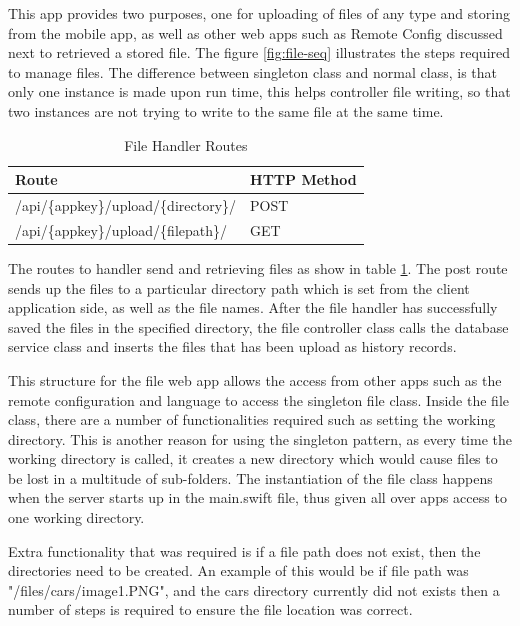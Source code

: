 This app provides two purposes, one for uploading of files of any type and storing from the mobile app, as well as other web apps such as Remote Config discussed next to retrieved a stored file. The figure \ref{fig:file-seq} illustrates the steps required to manage files. The difference between singleton class and normal class, is that only one instance is made upon run time, this helps controller file writing, so that two instances are not trying to write to the same file at the same time.

\begin{table}[!h]
\centering
\caption{File Handler Routes}
\label{tb:file-routes}
\begin{tabular}{|l|l|}
\hline
\rowcolor{green!20}
Route                                        & HTTP Method \\ \hline
/api/\{appkey\}/upload/\{directory\}/          & POST        \\ \hline
/api/\{appkey\}/upload/\{filepath\}/ & GET         \\ \hline
\end{tabular}
\end{table}


The routes to handler send and retrieving files as show in table \ref{tb:file-routes}. The post route sends up the files to a particular directory path which is set from the client application side, as well as the file names. After the file handler has successfully saved the files in the specified directory, the file controller class calls the database service class and inserts the files that has been upload as history records. 

This structure for the file web app allows the access from other apps such as the remote configuration and language to access the singleton file class. Inside the file class, there are a number of functionalities required such as setting the working directory. This is another reason for using the singleton pattern, as every time the working directory is called, it creates a new directory which would cause files to be lost in a multitude of sub-folders. The instantiation of the file class happens when the server starts up in the main.swift file, thus given all over apps access to one working directory.

Extra functionality that was required is if a file path does not exist, then the directories need to be created. An example of this would be if file path was "/files/cars/image1.PNG", and the cars directory currently did not exists then a number of steps is required to ensure the file location was correct.

